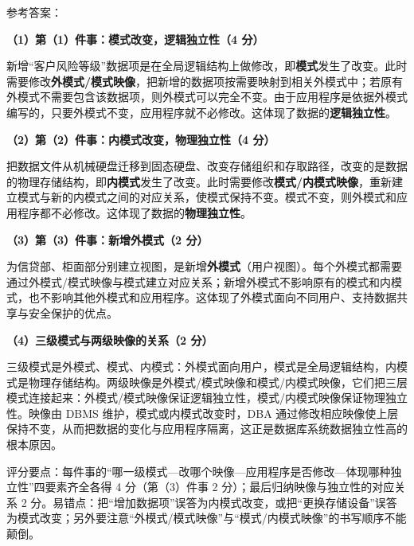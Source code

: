 \documentclass[a4paper,11pt]{article}
\begin{document}
\q 参考答案：

\textbf{（1）第（1）件事：模式改变，逻辑独立性（4 分）}

新增“客户风险等级”数据项是在全局逻辑结构上做修改，即\textbf{模式}发生了改变。此时需要修改\textbf{外模式/模式映像}，把新增的数据项按需要映射到相关外模式中；若原有外模式不需要包含该数据项，则外模式可以完全不变。由于应用程序是依据外模式编写的，只要外模式不变，应用程序就不必修改。这体现了数据的\textbf{逻辑独立性}。

\textbf{（2）第（2）件事：内模式改变，物理独立性（4 分）}

把数据文件从机械硬盘迁移到固态硬盘、改变存储组织和存取路径，改变的是数据的物理存储结构，即\textbf{内模式}发生了改变。此时需要修改\textbf{模式/内模式映像}，重新建立模式与新的内模式之间的对应关系，使模式保持不变。模式不变，则外模式和应用程序都不必修改。这体现了数据的\textbf{物理独立性}。

\textbf{（3）第（3）件事：新增外模式（2 分）}

为信贷部、柜面部分别建立视图，是新增\textbf{外模式}（用户视图）。每个外模式都需要通过外模式/模式映像与模式建立对应关系；新增外模式不影响原有的模式和内模式，也不影响其他外模式和应用程序。这体现了外模式面向不同用户、支持数据共享与安全保护的优点。

\textbf{（4）三级模式与两级映像的关系（2 分）}

三级模式是外模式、模式、内模式：外模式面向用户，模式是全局逻辑结构，内模式是物理存储结构。两级映像是外模式/模式映像和模式/内模式映像，它们把三层模式连接起来：外模式/模式映像保证逻辑独立性，模式/内模式映像保证物理独立性。映像由 DBMS 维护，模式或内模式改变时，DBA 通过修改相应映像使上层保持不变，从而把数据的变化与应用程序隔离，这正是数据库系统数据独立性高的根本原因。
\begin{analysis}评分要点：每件事的“哪一级模式—改哪个映像—应用程序是否修改—体现哪种独立性”四要素齐全各得 4 分（第（3）件事 2 分）；最后归纳映像与独立性的对应关系 2 分。易错点：把“增加数据项”误答为内模式改变，或把“更换存储设备”误答为模式改变；另外要注意“外模式/模式映像”与“模式/内模式映像”的书写顺序不能颠倒。\end{analysis}
\end{document}
